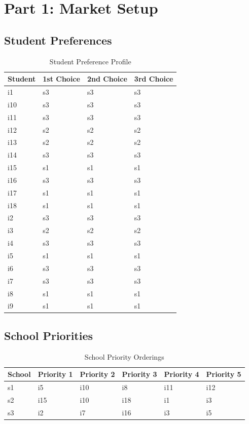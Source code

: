 \documentclass{article}
\title{ECN 591: Market Design Problem Set #2}
\author{Alyssa Alvarez}
\date{February 23, 2026}
\begin{document}
\maketitle

\section*{Part 1: Market Setup}

\subsection*{Student Preferences}

\begin{table}[H]
\centering
\caption{Student Preference Profile}
\begin{tabular}{llll}
\toprule
Student & 1st Choice & 2nd Choice & 3rd Choice \\
\midrule
i1 & s3 & s3 & s3 \\
i10 & s3 & s3 & s3 \\
i11 & s3 & s3 & s3 \\
i12 & s2 & s2 & s2 \\
i13 & s2 & s2 & s2 \\
i14 & s3 & s3 & s3 \\
i15 & s1 & s1 & s1 \\
i16 & s3 & s3 & s3 \\
i17 & s1 & s1 & s1 \\
i18 & s1 & s1 & s1 \\
i2 & s3 & s3 & s3 \\
i3 & s2 & s2 & s2 \\
i4 & s3 & s3 & s3 \\
i5 & s1 & s1 & s1 \\
i6 & s3 & s3 & s3 \\
i7 & s3 & s3 & s3 \\
i8 & s1 & s1 & s1 \\
i9 & s1 & s1 & s1 \\
\bottomrule
\end{tabular}
\end{table}

\subsection*{School Priorities}

\begin{table}[H]
\centering
\caption{School Priority Orderings}
\begin{tabular}{llllll}
\toprule
School & Priority 1 & Priority 2 & Priority 3 & Priority 4 & Priority 5 \\
\midrule
s1 & i5 & i10 & i8 & i11 & i12 \\
s2 & i15 & i10 & i18 & i1 & i3 \\
s3 & i2 & i7 & i16 & i3 & i5 \\
\bottomrule
\end{tabular}
\end{table}
\end{document}
